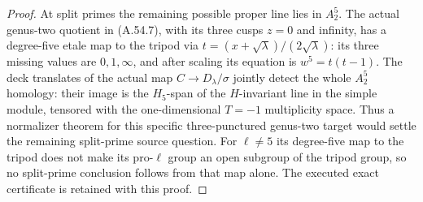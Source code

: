 \begin{proof}
At split primes the remaining possible proper line lies in
\(A_2^5\). The actual genus-two quotient in (A.54.7), with
its three cusps \(z=0\) and infinity, has a degree-five etale
map to the tripod via
\(t=(x+\sqrt\lambda)/(2\sqrt\lambda)\): its three missing
values are \(0,1,\infty\), and after scaling its equation is
\(w^5=t(t-1)\). The deck translates of the actual map
\(C\to D_\lambda/\sigma\) jointly detect the whole
\(A_2^5\) homology: their image is the \(H_5\)-span of the
\(H\)-invariant line in the simple module, tensored with the
one-dimensional \(T=-1\) multiplicity space. Thus a normalizer
theorem for this specific three-punctured genus-two target
would settle the remaining split-prime source question.
For \(\ell\ne5\) its degree-five map to the tripod does not
make its pro-\(\ell\) group an open subgroup of the tripod
group, so no split-prime conclusion follows from that map alone.
The executed exact certificate is retained with this proof.
\end{proof}
